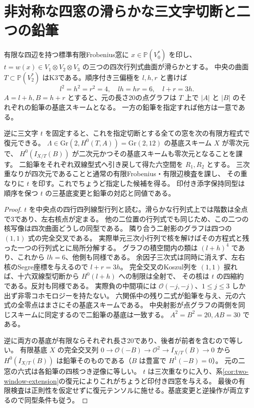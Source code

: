 \section{非対称な四窓の滑らかな三文字切断と二つの鉛筆}
\label{sec:finite-determinantal-marked-slice}
\begin{theorem}\label{thm:finite-determinantal-marked-slice}
有限な四辺を持つ標準有限Frobenius窓に $x\in\mathbb P(V_0^*)$ を印し、
$t=w(x)\in V_1\otimes V_2\otimes V_3$ の三つの四次行列式曲面が滑らかとする。
中央の曲面 $T\subset\mathbb P(V_2^*)$ はK3である。順序付き三偏極を
$l,h,r$ と書けば
\[
 l^2=h^2=r^2=4,\quad lh=hr=6,\quad l+r=3h .
\]
$A=l+h, B=h+r$ とすると、元の長さ20の点グラフは $T$ 上で
$|A|$ と $|B|$ のそれぞれの鉛筆の基底スキームとなる。
一方の鉛筆を指定すれば他方は一意である。

逆に三文字 $t$ を固定すると、これを指定切断とする全ての窓を次の有限方程式で復元できる。
$\Lambda\in\mathrm{Gr}(2,H^0(T,A))=\mathrm{Gr}(2,12)$ の基底スキーム $X$ が零次元で、
$H^0(I_{X/T}(B))$ が二次元かつその基底スキームも零次元となることを課す。
二鉛筆をそれぞれ双線型式へ引き戻して得た六空間を $R_1,R_2$ とする。
三次重なりが四次元であることと通常の有限Frobenius・有限辺検査を課し、
その重なりに $t$ を印す。これでちょうど指定した候補を得る。
印付き添字保持同型は順序を保つ $t$ の三基底変更と鉛筆の対応と同値である。
\end{theorem}
\begin{proof}
$t$ を中央点の四行四列線型行列と読む。滑らかな行列式上では階数は全点で3であり、左右核点が定まる。
他の二位置の行列式でも同じため、この二つの核写像は四次曲面どうしの同型である。
隣り合う二射影のグラフは四つの $(1,1)$ 式の完全交叉である。
実際単元三次小行列で核を解けばその方程式と残った一つの行列式とに局所分解する。
グラフの積空間内の類は $(l+h)^4$ であり、これから $lh=6$、他側も同様である。
余因子三次式は同時に消えず、左右核のSegre座標を与えるので $l+r=3h$。
完全交叉のKoszul列を $(1,1)$ 捩れば、十六双線型切断から $H^0(l+h)$ への制限は全射で、
その核は $t$ の四縮約である。反対も同様である。
実際負の中間項には $\mathcal O(-j,-j)$、$1\le j\le3$ しか出ず非零コホモロジーを持たない。
六関係中の残り二式が鉛筆を与え、元の六式の全零点はまさにその基底スキームである。
中央射影が点グラフの両側を同じスキームに同定するので二鉛筆の基底は一致する。
$A^2=B^2=20, AB=30$ である。

逆に両方の基底が有限ならそれぞれ長さ20であり、後者が前者を含むので等しい。
有限基底 $X$ の完全交叉列 $0\to\mathcal O(-B)\to\mathcal O^2\to I_{X/T}(B)\to0$
から $H^0(I_{X/T}(B))$ は鉛筆そのものである（$B$ は豊富で $H^1(-B)=0$）。
元の二窓の六式は各鉛筆の四核つき逆像に等しい。
$t$ は三次重なりに入り、系\ref{cor:two-window-extension}の復元によりこれがちょうど印付き四窓を与える。
最後の有限検査は正則性を仮定せずに復元テンソルに施せる。基底変更と逆操作が両立するので同型条件も従う。
\end{proof}


